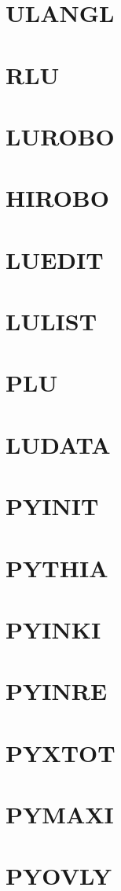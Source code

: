 \documentclass[10pt,UTF8]{ctexbook}
\begin{document}
\section{ULANGL}
\section{RLU}
\section{LUROBO}
\section{HIROBO}
\section{LUEDIT}
\section{LULIST}
\section{PLU}
\section{LUDATA}
\section{PYINIT}
\section{PYTHIA}
\section{PYINKI}
\section{PYINRE}
\section{PYXTOT}
\section{PYMAXI}
\section{PYOVLY}
\end{document}
